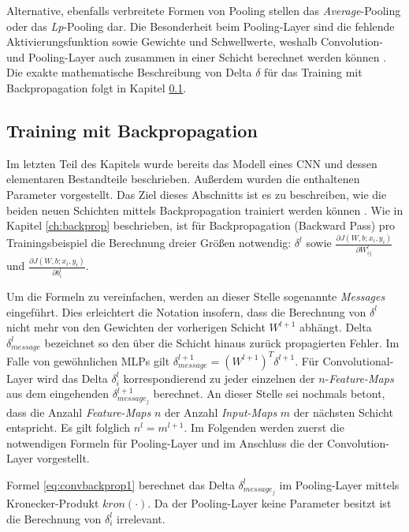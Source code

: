 Alternative, ebenfalls verbreitete Formen von Pooling stellen das \textit{Average}-Pooling \cite[vgl.][]{LeCun1998} oder das \textit{Lp}-Pooling \cite[vgl.][]{Sermanet2012} dar. 
Die Besonderheit beim Pooling-Layer sind die fehlende Aktivierungsfunktion sowie Gewichte und Schwellwerte, weshalb Convolution- und Pooling-Layer auch zusammen in einer Schicht berechnet werden können \cite[vgl.][]{Simard2003}.
Die exakte mathematische Beschreibung von Delta $\delta$ für das Training mit Backpropagation folgt in Kapitel \ref{ch:cnn_back}.

\subsection{Training mit Backpropagation}
\label{ch:cnn_back}
Im letzten Teil des Kapitels wurde bereits das Modell eines CNN und dessen elementaren Bestandteile beschrieben. Außerdem wurden die enthaltenen Parameter vorgestellt. Das Ziel dieses Abschnitts ist es zu beschreiben, wie die beiden neuen Schichten mittels Backpropagation trainiert werden können \cite[vgl. z.B.][]{Bouvrie2006}. Wie in Kapitel \ref{ch:backprop} beschrieben, ist für Backpropagation (Backward Pass) pro Trainingsbeispiel die Berechnung dreier Größen notwendig: $\delta^l$ sowie $\frac{\partial J(W,b;x_i,y_i)}{\partial W_{ij}^l}$ und $\frac{\partial J(W,b;x_i,y_i)}{\partial b_i^l}$. 

Um die Formeln zu vereinfachen, werden an dieser Stelle sogenannte \textit{Messages} eingeführt. Dies erleichtert die Notation insofern, dass die Berechnung von $\delta^l$ nicht mehr von den Gewichten der vorherigen Schicht $W^{l+1}$ abhängt. Delta $\delta_{message}^{l}$ bezeichnet so den über die Schicht hinaus zurück propagierten Fehler. Im Falle von gewöhnlichen MLPs gilt $\delta_{message}^{l+1} = (W^{l+1})^T\delta^{l+1}$. 
Für Convolutional-Layer wird das Delta $\delta_{i}^{l}$ korrespondierend zu jeder einzelnen der $n$-\textit{Feature-Maps} aus dem eingehenden $\delta_{message_j}^{l+1}$ berechnet. An dieser Stelle sei nochmals betont, dass die Anzahl \textit{Feature-Maps} $n$ der Anzahl \textit{Input-Maps} $m$ der nächsten Schicht entspricht. Es gilt folglich $n^l = m^{l+1}$. 
Im Folgenden werden zuerst die notwendigen Formeln für Pooling-Layer und im Anschluss die der Convolution-Layer vorgestellt.

Formel \ref{eq:convbackprop1} berechnet das Delta $\delta_{message_j}^{l}$ im Pooling-Layer mittels Kronecker-Produkt $kron(\cdot)$. Da der Pooling-Layer keine Parameter besitzt ist die Berechnung von $\delta_i^{l}$ irrelevant.

